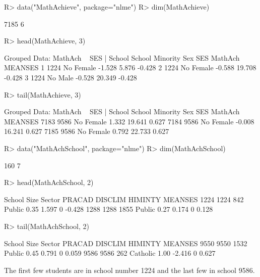 \documentclass[
]{jss}
\begin{document}
\begin{CodeChunk}
\begin{CodeInput}
R> data("MathAchieve", package="nlme")
R> dim(MathAchieve)
\end{CodeInput}
\begin{CodeOutput}
[1] 7185    6
\end{CodeOutput}
\begin{CodeInput}
R> head(MathAchieve, 3)
\end{CodeInput}
\begin{CodeOutput}
Grouped Data: MathAch ~ SES | School
  School Minority    Sex    SES MathAch MEANSES
1   1224       No Female -1.528   5.876  -0.428
2   1224       No Female -0.588  19.708  -0.428
3   1224       No   Male -0.528  20.349  -0.428
\end{CodeOutput}
\begin{CodeInput}
R> tail(MathAchieve, 3)
\end{CodeInput}
\begin{CodeOutput}
Grouped Data: MathAch ~ SES | School
     School Minority    Sex    SES MathAch MEANSES
7183   9586       No Female  1.332  19.641   0.627
7184   9586       No Female -0.008  16.241   0.627
7185   9586       No Female  0.792  22.733   0.627
\end{CodeOutput}
\begin{CodeInput}
R> data("MathAchSchool", package="nlme")
R> dim(MathAchSchool)
\end{CodeInput}
\begin{CodeOutput}
[1] 160   7
\end{CodeOutput}
\begin{CodeInput}
R> head(MathAchSchool, 2)
\end{CodeInput}
\begin{CodeOutput}
     School Size Sector PRACAD DISCLIM HIMINTY MEANSES
1224   1224  842 Public   0.35   1.597       0  -0.428
1288   1288 1855 Public   0.27   0.174       0   0.128
\end{CodeOutput}
\begin{CodeInput}
R> tail(MathAchSchool, 2)
\end{CodeInput}
\begin{CodeOutput}
     School Size   Sector PRACAD DISCLIM HIMINTY MEANSES
9550   9550 1532   Public   0.45   0.791       0   0.059
9586   9586  262 Catholic   1.00  -2.416       0   0.627
\end{CodeOutput}
\end{CodeChunk}

The first few students are in school number 1224 and the last few in
school 9586.
\end{document}
